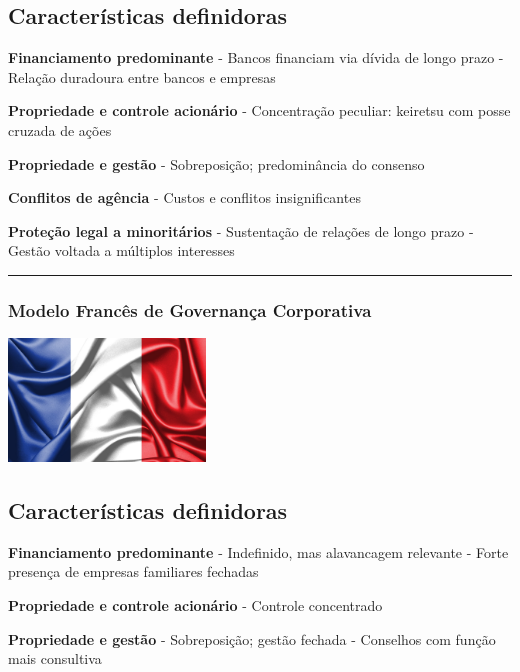 \documentclass[
]{book}
\begin{document}
\subsection{Características definidoras}\label{caracteruxedsticas-definidoras-2}

\textbf{Financiamento predominante} - Bancos financiam via dívida de longo prazo - Relação duradoura entre bancos e empresas

\textbf{Propriedade e controle acionário} - Concentração peculiar: keiretsu com posse cruzada de ações

\textbf{Propriedade e gestão} - Sobreposição; predominância do consenso

\textbf{Conflitos de agência} - Custos e conflitos insignificantes

\textbf{Proteção legal a minoritários} - Sustentação de relações de longo prazo - Gestão voltada a múltiplos interesses

\begin{center}\rule{0.5\linewidth}{0.5pt}\end{center}

\subsubsection{Modelo Francês de Governança Corporativa}\label{modelo-francuxeas-de-governanuxe7a-corporativa}

\includegraphics[width=2.0625in,height=\textheight]{images/02-2025-08-12_13/08-modelo_frances.jpg}

\subsection{Características definidoras}\label{caracteruxedsticas-definidoras-3}

\textbf{Financiamento predominante} - Indefinido, mas alavancagem relevante - Forte presença de empresas familiares fechadas

\textbf{Propriedade e controle acionário} - Controle concentrado

\textbf{Propriedade e gestão} - Sobreposição; gestão fechada - Conselhos com função mais consultiva
\end{document}
